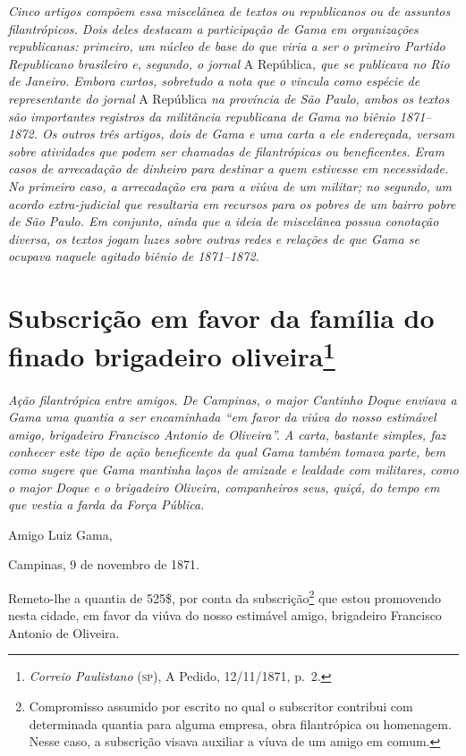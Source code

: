 \begin{argumento}
\emph{Cinco artigos compõem essa miscelânea de textos ou republicanos ou
de assuntos filantrópicos. Dois deles destacam a participação de Gama em
organizações republicanas: primeiro, um núcleo de base do que viria a
ser o primeiro Partido Republicano brasileiro e, segundo, o jornal} A
República\emph{, que se publicava no Rio de Janeiro. Embora curtos,
sobretudo a nota que o vincula como espécie de representante do jornal}
A República \emph{na província de São Paulo, ambos os textos são
importantes registros da militância republicana de Gama no biênio
1871--1872. Os outros três artigos, dois de Gama e uma carta a ele
endereçada, versam sobre atividades que podem ser chamadas de
filantrópicas ou beneficentes. Eram casos de arrecadação de dinheiro
para destinar a quem estivesse em necessidade. No primeiro caso, a
arrecadação era para a viúva de um militar; no segundo, um acordo
extra-judicial que resultaria em recursos para os pobres de um bairro
pobre de São Paulo. Em conjunto, ainda que a ideia de miscelânea possua
conotação diversa, os textos jogam luzes sobre outras redes e relações
de que Gama se ocupava naquele agitado biênio de 1871--1872.}
\end{argumento}

\chapter{Subscrição em favor da família do finado brigadeiro oliveira\footnote{\emph{Correio Paulistano} (\textsc{sp}), A Pedido, 12/11/1871,
  p.~2.}} %

\begin{didascalia}
\emph{Ação filantrópica entre amigos. De Campinas, o major Cantinho
Doque enviava a Gama uma quantia a ser encaminhada ``em favor da viúva do
nosso estimável amigo, brigadeiro Francisco Antonio de Oliveira''. A
carta, bastante simples, faz conhecer este tipo de ação beneficente da
qual Gama também tomava parte, bem como sugere que Gama mantinha laços
de amizade e lealdade com militares, como o major Doque e o brigadeiro
Oliveira, companheiros seus, quiçá, do tempo em que vestia a farda da
Força Pública.}
\end{didascalia}


Amigo Luiz Gama,

Campinas, 9 de novembro de 1871.

Remeto-lhe a quantia de 525\$, por conta da subscrição\footnote{
  Compromisso assumido por escrito no qual o subscritor contribui com
  determinada quantia para alguma empresa, obra filantrópica ou
  homenagem. Nesse caso, a subscrição visava auxiliar a víuva de um
  amigo em comum.} que estou promovendo nesta cidade, em favor da viúva
do nosso estimável amigo, brigadeiro Francisco Antonio de Oliveira.

